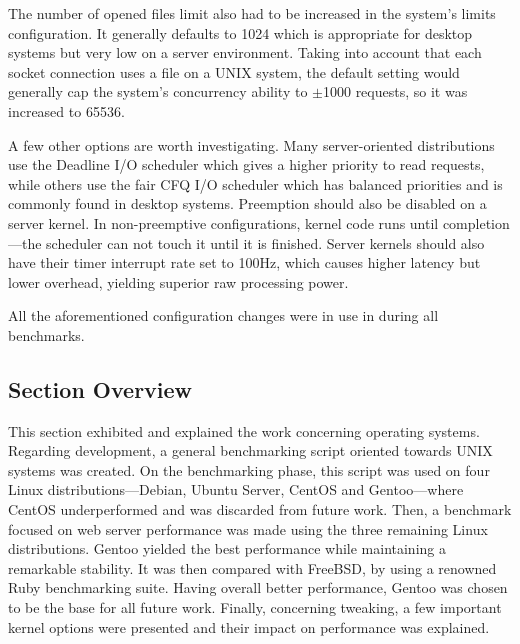 The number of opened files limit also had to be increased in the system's limits configuration. It generally defaults to 1024 which is appropriate for desktop systems but very low on a server environment. Taking into account that each socket connection uses a file on a UNIX system, the default setting would generally cap the system's concurrency ability to $\pm$1000 requests, so it was increased to 65536.

A few other options are worth investigating. Many server-oriented distributions use the Deadline I/O scheduler which gives a higher priority to read requests, while others use the fair CFQ I/O scheduler which has balanced priorities and is commonly found in desktop systems. Preemption should also be disabled on a server kernel. In non-preemptive configurations, kernel code runs until completion---the scheduler can not touch it until it is finished. Server kernels should also have their timer interrupt rate set to 100Hz, which causes higher latency but lower overhead, yielding superior raw processing power.

All the aforementioned configuration changes were in use in during all benchmarks.


\subsection{Section Overview}
This section exhibited and explained the work concerning operating systems. Regarding development, a general benchmarking script oriented towards UNIX systems was created. On the benchmarking phase, this script was used on four Linux distributions---Debian, Ubuntu Server, CentOS and Gentoo---where CentOS underperformed and was discarded from future work. Then, a benchmark focused on web server performance was made using the three remaining Linux distributions. Gentoo yielded the best performance while maintaining a remarkable stability. It was then compared with FreeBSD, by using a renowned Ruby benchmarking suite. Having overall better performance, Gentoo was chosen to be the base for all future work. Finally, concerning tweaking, a few important kernel options were presented and their impact on performance was explained. 
